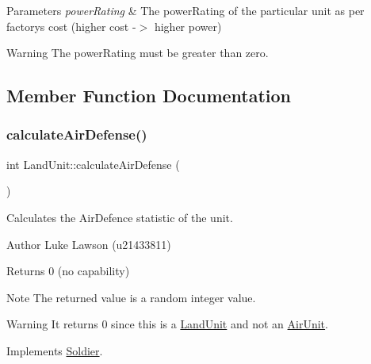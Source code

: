 \begin{DoxyParams}{Parameters}
{\em power\+Rating} & The power\+Rating of the particular unit as per factory\textquotesingle{}s cost (higher cost -\/$>$ higher power) \\
\hline
\end{DoxyParams}
\begin{DoxyWarning}{Warning}
The power\+Rating must be greater than zero. 
\end{DoxyWarning}


\subsection{Member Function Documentation}
\mbox{\label{class_land_unit_acf9d648efacea20a028b2d9dcaca0d64}} 
\subsubsection{\texorpdfstring{calculateAirDefense()}{calculateAirDefense()}}
{\footnotesize\ttfamily int Land\+Unit\+::calculate\+Air\+Defense (\begin{DoxyParamCaption}{ }\end{DoxyParamCaption})\hspace{0.3cm}{\ttfamily [virtual]}}



Calculates the Air\+Defence statistic of the unit. 

\begin{DoxyAuthor}{Author}
Luke Lawson (u21433811) 
\end{DoxyAuthor}
\begin{DoxyReturn}{Returns}
0 (no capability) 
\end{DoxyReturn}
\begin{DoxyNote}{Note}
The returned value is a random integer value. 
\end{DoxyNote}
\begin{DoxyWarning}{Warning}
It returns 0 since this is a \mbox{\hyperlink{class_land_unit}{Land\+Unit}} and not an \mbox{\hyperlink{class_air_unit}{Air\+Unit}}. 
\end{DoxyWarning}


Implements \mbox{\hyperlink{class_soldier_a3dc2d7a06621380c4561d330d5359dc2}{Soldier}}.

\mbox{\label{class_land_unit_af6b72446b89f0cceda3e71f0ccefd41e}} 

